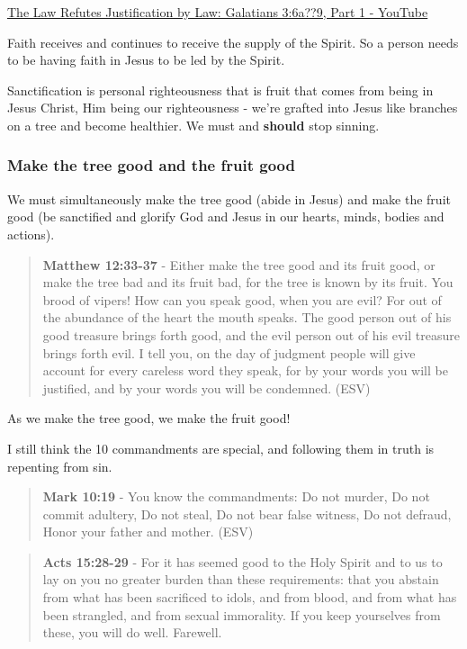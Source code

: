 \documentclass[11pt]{article}
\begin{document}
\href{https://www.youtube.com/watch?v=34pBf5pZq\_I}{The Law Refutes Justification by Law: Galatians 3:6a??9, Part 1 - YouTube}

Faith receives and continues to receive the supply of the Spirit. So a person needs to be having faith in Jesus to be led by the Spirit.

Sanctification is personal righteousness that is fruit that comes from being in Jesus Christ, Him being our righteousness - we're grafted into Jesus like branches on a tree and become healthier. We must and \textbf{should} stop sinning.

\subsubsection{Make the tree good and the fruit good}
\label{sec:orga3d3d6e}

We must simultaneously make the tree good (abide in Jesus) and make the fruit good (be sanctified and glorify God and Jesus in our hearts, minds, bodies and actions).

\begin{quote}
\textbf{Matthew 12:33-37} - Either make the tree good and its fruit good, or make the tree bad and its fruit bad, for the tree is known by its fruit. You brood of vipers! How can you speak good, when you are evil? For out of the abundance of the heart the mouth speaks. The good person out of his good treasure brings forth good, and the evil person out of his evil treasure brings forth evil. I tell you, on the day of judgment people will give account for every careless word they speak, for by your words you will be justified, and by your words you will be condemned. (ESV)
\end{quote}

As we make the tree good, we make the fruit good!

I still think the 10 commandments are special, and following them in truth is repenting from sin.

\begin{quote}
\textbf{Mark 10:19} - You know the commandments: Do not murder, Do not commit adultery, Do not steal, Do not bear false witness, Do not defraud, Honor your father and mother. (ESV)
\end{quote}

\begin{quote}
\textbf{Acts 15:28-29} - For it has seemed good to the Holy Spirit and to us to lay on you no greater burden than these requirements: that you abstain from what has been sacrificed to idols, and from blood, and from what has been strangled, and from sexual immorality. If you keep yourselves from these, you will do well. Farewell.
\end{quote}
\end{document}
